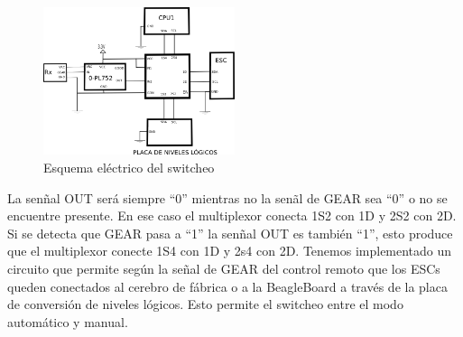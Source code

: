 \documentclass[main]{subfiles}
\begin{document}
\begin{figure}
\begin{center}
\includegraphics[width=0.5\textwidth]{./pics_switcheo/path3552-7.png}
\caption{Esquema el\'ectrico del switcheo}
\label{fig:switcheo}
\end{center}
\end{figure}

La sen\~nal OUT ser\'a siempre ``0'' mientras no la sen\~al de GEAR sea ``0'' o no se encuentre presente. En ese caso el multiplexor conecta 1S2 con 1D y 2S2 con 2D. Si se detecta que GEAR pasa a ``1'' la sen\~nal OUT es tambi\'en ``1'', esto produce que el multiplexor conecte 1S4 con 1D y 2s4 con 2D. Tenemos implementado un circuito que permite seg\'un la se\~nal de GEAR del control remoto que los ESCs queden conectados al cerebro de f\'abrica o a la BeagleBoard a trav\'es de la placa de conversi\'on de niveles l\'ogicos. Esto permite el switcheo entre el modo autom\'atico y manual.
\end{document}
